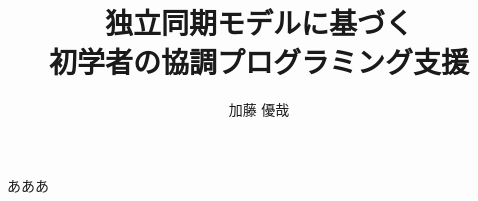 \documentclass[11pt, a4paper]{jarticle}
\title{独立同期モデルに基づく \\ 初学者の協調プログラミング支援}
\author{加藤 優哉}
\begin{document}
\maketitle

あああ
\end{document}
